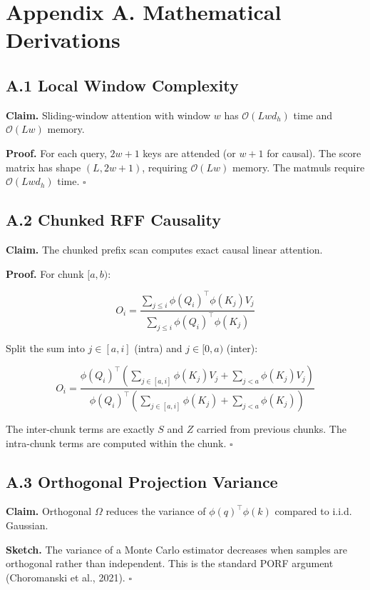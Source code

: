 
\section{Appendix A. Mathematical Derivations}

\subsection{A.1 Local Window Complexity}

\textbf{Claim.} Sliding-window attention with window $w$ has $\mathcal{O}(L w d_h)$ 
time and $\mathcal{O}(L w)$ memory.

\textbf{Proof.} For each query, $2w + 1$ keys are attended (or $w + 1$ for causal). 
The score matrix has shape $(L, 2w+1)$, requiring $\mathcal{O}(L w)$ memory. 
The matmuls require $\mathcal{O}(L w d_h)$ time. $\square$

\subsection{A.2 Chunked RFF Causality}

\textbf{Claim.} The chunked prefix scan computes exact causal linear attention.

\textbf{Proof.} For chunk $[a, b)$:

\[
O_i = \frac{\sum_{j \le i} \phi(Q_i)^\top \phi(K_j) V_j}{\sum_{j \le i} \phi(Q_i)^\top \phi(K_j)}
\tag{A.1}
\]

Split the sum into $j \in [a, i]$ (intra) and $j \in [0, a)$ (inter):

\[
O_i = \frac{\phi(Q_i)^\top \left(\sum_{j \in [a, i]} \phi(K_j) V_j + \sum_{j < a} \phi(K_j) V_j\right)}{\phi(Q_i)^\top \left(\sum_{j \in [a, i]} \phi(K_j) + \sum_{j < a} \phi(K_j)\right)}
\tag{A.2}
\]

The inter-chunk terms are exactly $S$ and $Z$ carried from previous chunks. 
The intra-chunk terms are computed within the chunk. $\square$

\subsection{A.3 Orthogonal Projection Variance}

\textbf{Claim.} Orthogonal $\Omega$ reduces the variance of $\phi(q)^\top \phi(k)$ 
compared to i.i.d. Gaussian.

\textbf{Sketch.} The variance of a Monte Carlo estimator decreases when samples 
are orthogonal rather than independent. This is the standard PORF argument 
(Choromanski et al., 2021). $\square$

